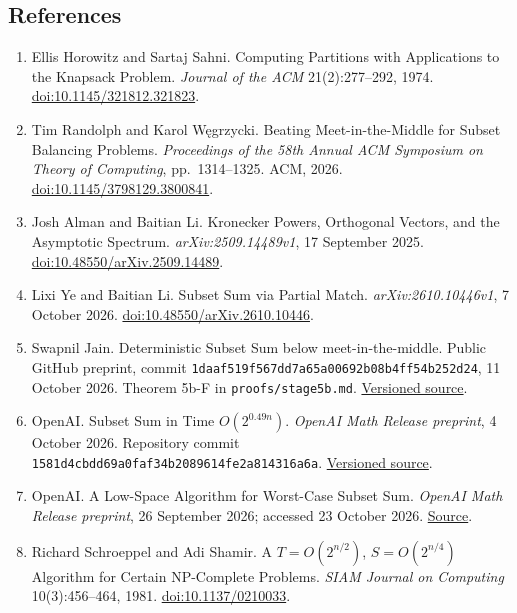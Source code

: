 \hypertarget{af-a9ec399514-references}{%
\subsection{References}\label{af-a9ec399514-references}}

\begin{enumerate}
\def\labelenumi{\arabic{enumi}.}
\item
  Ellis Horowitz and Sartaj Sahni. Computing Partitions with Applications to the Knapsack Problem. \emph{Journal of the ACM} 21(2):277--292, 1974. \href{https://doi.org/10.1145/321812.321823}{doi:10.1145/321812.321823}.
\item
  Tim Randolph and Karol Węgrzycki. Beating Meet-in-the-Middle for Subset Balancing Problems. \emph{Proceedings of the 58th Annual ACM Symposium on Theory of Computing}, pp.~1314--1325. ACM, 2026. \href{https://doi.org/10.1145/3798129.3800841}{doi:10.1145/3798129.3800841}.
\item
  Josh Alman and Baitian Li. Kronecker Powers, Orthogonal Vectors, and the Asymptotic Spectrum. \emph{arXiv:2509.14489v1}, 17 September 2025. \href{https://arxiv.org/abs/2509.14489v1}{doi:10.48550/arXiv.2509.14489}.
\item
  Lixi Ye and Baitian Li. Subset Sum via Partial Match. \emph{arXiv:2610.10446v1}, 7 October 2026. \href{https://arxiv.org/abs/2610.10446v1}{doi:10.48550/arXiv.2610.10446}.
\item
  Swapnil Jain. Deterministic Subset Sum below meet-in-the-middle. Public GitHub preprint, commit \texttt{1daaf519f567dd7a65a00692b08b4ff54b252d24}, 11 October 2026. Theorem 5b-F in \texttt{proofs/stage5b.md}. \href{https://github.com/Swapnil-jain/subsetsum-derand/tree/1daaf519f567dd7a65a00692b08b4ff54b252d24}{Versioned source}.
\item
  OpenAI. Subset Sum in Time \(O(2^{0.49n})\). \emph{OpenAI Math Release preprint}, 4 October 2026. Repository commit \texttt{1581d4cbdd69a0faf34b2089614fe2a814316a6a}. \href{https://github.com/openai/math/tree/1581d4cbdd69a0faf34b2089614fe2a814316a6a/preprints/Subset-Sum-in-Time-2-power-0-49n-October-4-2026}{Versioned source}.
\item
  OpenAI. A Low-Space Algorithm for Worst-Case Subset Sum. \emph{OpenAI Math Release preprint}, 26 September 2026; accessed 23 October 2026. \href{https://github.com/openai/math/tree/main/preprints/A-Low-Space-Algorithm-for-Worst-Case-Subset-Sum-September-26-2026}{Source}.
\item
  Richard Schroeppel and Adi Shamir. A \(T=O(2^{n/2})\), \(S=O(2^{n/4})\) Algorithm for Certain NP-Complete Problems. \emph{SIAM Journal on Computing} 10(3):456--464, 1981. \href{https://doi.org/10.1137/0210033}{doi:10.1137/0210033}.

\end{enumerate}

